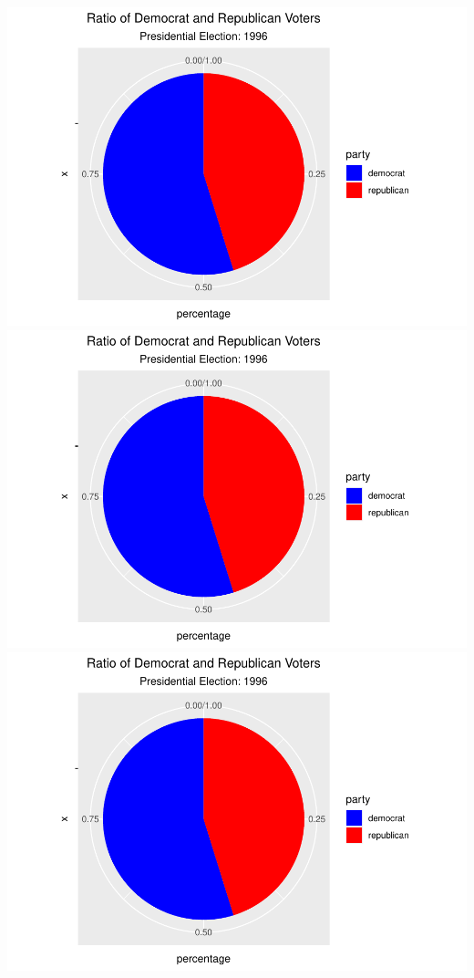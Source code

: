 \documentclass[
]{article}
\begin{document}
\includegraphics{election_files/figure-latex/anim-49.pdf}
\includegraphics{election_files/figure-latex/anim-50.pdf}
\includegraphics{election_files/figure-latex/anim-51.pdf}
\end{document}
